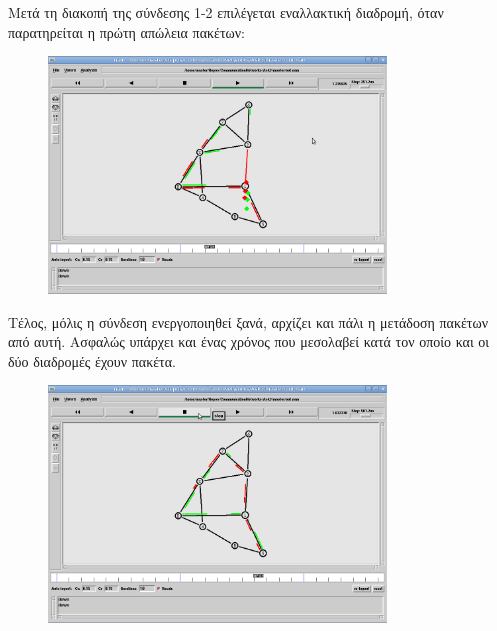 \documentclass[a4paper,9pt]{article}
\begin{document}
Μετά τη διακοπή της σύνδεσης 1-2 επιλέγεται εναλλακτική διαδρομή, όταν
παρατηρείται η πρώτη απώλεια πακέτων:

\begin{figure}[h]
    \centering
    \includegraphics[width=0.8\textwidth]{files/5.png}
\end{figure}

Τέλος, μόλις η σύνδεση ενεργοποιηθεί ξανά, αρχίζει και πάλι η μετάδοση πακέτων
από αυτή. Ασφαλώς υπάρχει και ένας χρόνος που μεσολαβεί κατά τον οποίο και οι
δύο διαδρομές έχουν πακέτα.

\begin{figure}[h]
    \centering
    \includegraphics[width=0.8\textwidth]{files/6.png}
\end{figure}
\end{document}

